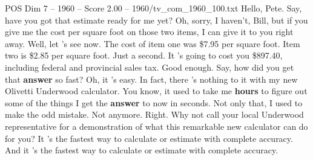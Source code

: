 \begin{textsample}{POS Dim 7 – 1960 – Score 2.00 – 1960/tv\_com\_1960\_100.txt}  \label{ex:f7_pos_028}
Hello, Pete.
Say, have you got that estimate ready for me yet?
Oh, sorry, I haven't, Bill, but if you give me the cost per square foot on those two items, I can give it to you right away.
Well, let 's see now.
The cost of item one was \$7.95 per square foot.
Item two is \$2.85 per square foot.
Just a second.
It 's going to cost you \$897.40, including federal and provincial sales tax.
Good enough.
Say, how did you get that \textbf{answer} so fast?
Oh, it 's easy.
In fact, there 's nothing to it with my new Olivetti Underwood calculator.
You know, it used to take me \textbf{hours} to figure out some of the things I get the \textbf{answer} to now in seconds.
Not only that, I used to make the odd mistake.
Not anymore.
Right.
Why not call your local Underwood representative for a demonstration of what this remarkable new calculator can do for you?
It 's the fastest way to calculate or estimate with complete accuracy.
And it 's the fastest way to calculate or estimate with complete accuracy.

\end{textsample}
